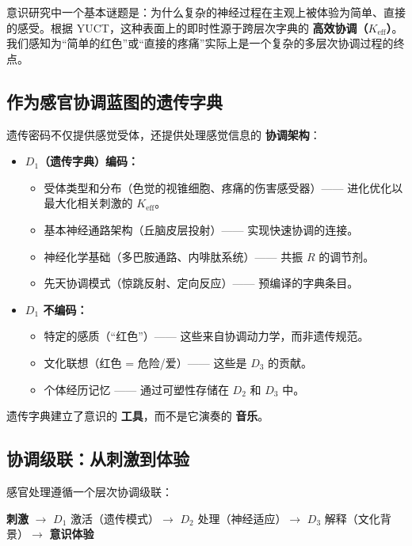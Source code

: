 \documentclass[12pt,a4paper]{article}
\newcommand{\eff}{\mathrm{eff}}
\newcommand{\Ke}{K_{\eff}}
\begin{document}
	意识研究中一个基本谜题是：为什么复杂的神经过程在主观上被体验为简单、直接的感受。根据 YUCT，这种表面上的即时性源于跨层次字典的 \textbf{高效协调（$\Ke$）}。我们感知为“简单的红色”或“直接的疼痛”实际上是一个复杂的多层次协调过程的终点。
	
	\subsection{作为感官协调蓝图的遗传字典}
	
	遗传密码不仅提供感觉受体，还提供处理感觉信息的 \textbf{协调架构}：
	
	\begin{itemize}
		\item \textbf{$D_1$（遗传字典）编码：}
		\begin{itemize}
			\item 受体类型和分布（色觉的视锥细胞、疼痛的伤害感受器）—— 进化优化以最大化相关刺激的 $\Ke$。
			\item 基本神经通路架构（丘脑皮层投射）—— 实现快速协调的连接。
			\item 神经化学基础（多巴胺通路、内啡肽系统）—— 共振 $R$ 的调节剂。
			\item 先天协调模式（惊跳反射、定向反应）—— 预编译的字典条目。
		\end{itemize}
		
		\item \textbf{$D_1$ 不编码：}
		\begin{itemize}
			\item 特定的感质（“红色”）—— 这些来自协调动力学，而非遗传规范。
			\item 文化联想（红色 = 危险/爱）—— 这些是 $D_3$ 的贡献。
			\item 个体经历记忆 —— 通过可塑性存储在 $D_2$ 和 $D_3$ 中。
		\end{itemize}
	\end{itemize}
	
	遗传字典建立了意识的 \textbf{工具}，而不是它演奏的 \textbf{音乐}。
	
	\subsection{协调级联：从刺激到体验}
	
	感官处理遵循一个层次协调级联：
	
	\begin{center}
		\textbf{刺激} $\rightarrow$ $D_1$ 激活（遗传模式）$\rightarrow$ $D_2$ 处理（神经适应）$\rightarrow$ $D_3$ 解释（文化背景）$\rightarrow$ \textbf{意识体验}
	\end{center}
	
\end{document}
